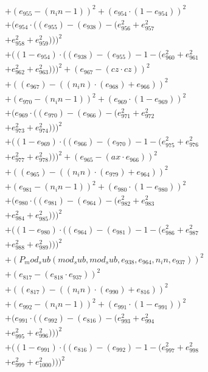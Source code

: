 \documentclass[10pt, a4paper]{article}
\begin{document}
\begin{small}
\begin{align*}
& + (e_{955} - (n_in - 1))^{2} + (e_{954}  \cdot  (1 - e_{954}))^{2} \\
& + (e_{954}  \cdot  ((e_{955}) - (e_{938}) - (e_{956}^{2} + e_{957}^{2} \\
& + e_{958}^{2} + e_{959}^{2})))^{2} \\
& + ((1 - e_{954})  \cdot  ((e_{938}) - (e_{955}) - 1 - (e_{960}^{2} + e_{961}^{2} \\
& + e_{962}^{2} + e_{963}^{2})))^{2} + (e_{967} - (cz  \cdot  cz))^{2} \\
& + ((e_{967}) - ((n_in)  \cdot  (e_{968}) + e_{966}))^{2} \\
& + (e_{970} - (n_in - 1))^{2} + (e_{969}  \cdot  (1 - e_{969}))^{2} \\
& + (e_{969}  \cdot  ((e_{970}) - (e_{966}) - (e_{971}^{2} + e_{972}^{2} \\
& + e_{973}^{2} + e_{974}^{2})))^{2} \\
& + ((1 - e_{969})  \cdot  ((e_{966}) - (e_{970}) - 1 - (e_{975}^{2} + e_{976}^{2} \\
& + e_{977}^{2} + e_{978}^{2})))^{2} + (e_{965} - (ax  \cdot  e_{966}))^{2} \\
& + ((e_{965}) - ((n_in)  \cdot  (e_{979}) + e_{964}))^{2} \\
& + (e_{981} - (n_in - 1))^{2} + (e_{980}  \cdot  (1 - e_{980}))^{2} \\
& + (e_{980}  \cdot  ((e_{981}) - (e_{964}) - (e_{982}^{2} + e_{983}^{2} \\
& + e_{984}^{2} + e_{985}^{2})))^{2} \\
& + ((1 - e_{980})  \cdot  ((e_{964}) - (e_{981}) - 1 - (e_{986}^{2} + e_{987}^{2} \\
& + e_{988}^{2} + e_{989}^{2})))^{2} \\
& + (P_mod_sub(mod_sub, mod_sub, e_{938}, e_{964}, n_in, e_{937}))^{2} \\
& + (e_{817} - (e_{818}  \cdot  e_{937}))^{2} \\
& + ((e_{817}) - ((n_in)  \cdot  (e_{990}) + e_{816}))^{2} \\
& + (e_{992} - (n_in - 1))^{2} + (e_{991}  \cdot  (1 - e_{991}))^{2} \\
& + (e_{991}  \cdot  ((e_{992}) - (e_{816}) - (e_{993}^{2} + e_{994}^{2} \\
& + e_{995}^{2} + e_{996}^{2})))^{2} \\
& + ((1 - e_{991})  \cdot  ((e_{816}) - (e_{992}) - 1 - (e_{997}^{2} + e_{998}^{2} \\
& + e_{999}^{2} + e_{1000}^{2})))^{2} \\

\end{align*}
\end{small}
\end{document}
